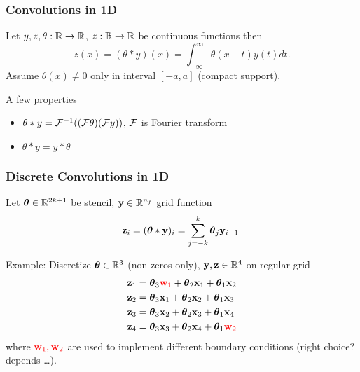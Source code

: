 \documentclass[12pt,fleqn,handout]{beamer}
\begin{document}
\begin{frame}\frametitle{Convolutions in 1D}
	Let $y, z, \theta:\mathbb{R} \to \mathbb{R}$, $z : \mathbb{R}\to\mathbb{R}$ be continuous functions then
	\begin{equation*}
		z(x) = (\theta * y)(x) = \int_{-\infty}^\infty \theta(x-t) y(t) dt.
	\end{equation*}
	Assume $\theta(x) \neq 0$ only in interval $[-a,a]$ (compact support).
	
	\bigskip
	\pause
	
	A few properties
	\begin{itemize}
	\item $ \theta * y = {\cal F}^{-1}(({\cal F} \theta) ({\cal F} y))$, ${\cal F}$ is Fourier transform
	\item $ \theta * y =  y * \theta$ 
	\end{itemize}
	
	
\end{frame}	

\begin{frame}\frametitle{Discrete Convolutions in 1D}
	Let ${\boldsymbol \theta} \in\mathbb{R}^{2k+1}$ be stencil, ${\bf y} \in \mathbb{R}^{n_f}$ grid function
\begin{equation*}
		{\bf z}_i = ({\boldsymbol \theta} * {\bf y})_i = \sum_{j=-k}^k {\boldsymbol \theta}_{j} {\bf y}_{i-1}.
	\end{equation*}
	
	\bigskip
	\pause

	 Example: Discretize ${\boldsymbol \theta} \in \mathbb{R}^3$ (non-zeros only), ${\bf y},{\bf z} \in \mathbb{R}^4$ on regular grid
	 \begin{align*}
	 	{\bf z}_1 & = {\boldsymbol \theta}_3 \textcolor{red}{{\bf w}_1} + {\boldsymbol \theta}_2 {\bf x}_1 + {\boldsymbol \theta}_1 {\bf x}_2 \\
	 	{\bf z}_2 & = {\boldsymbol \theta}_3 {\bf x}_1 + {\boldsymbol \theta}_2 {\bf x}_2 + {\boldsymbol \theta}_1 {\bf x}_3 \\
	 	{\bf z}_3 & = {\boldsymbol \theta}_3 {\bf x}_2 + {\boldsymbol \theta}_2 {\bf x}_3 + {\boldsymbol \theta}_1 {\bf x}_4 \\
	 	{\bf z}_4 & = {\boldsymbol \theta}_3 {\bf x}_3 + {\boldsymbol \theta}_2 {\bf x}_4 + {\boldsymbol \theta}_1 \textcolor{red}{{\bf w}_2}
	 \end{align*}
	 where $\textcolor{red}{{\bf w}_1, {\bf w}_2}$ are used to implement different boundary conditions (right choice? depends \ldots).
\end{frame}
\end{document}

